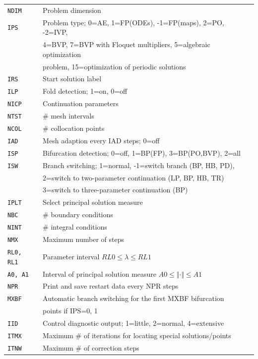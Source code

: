 \documentclass[12pt]{report}
\begin{document}
\begin{tabular}{|l|l|}
\hline
{\tt NDIM} & Problem dimension \\
{\tt IPS}  & Problem type; 0=AE, 1=FP(ODEs), -1=FP(maps), 2=PO,
           -2=IVP,\\
           & 4=BVP, 7=BVP with Floquet multipliers, 5=algebraic
           optimization \\
 	   & problem, 15=optimization of periodic solutions \\
{\tt IRS}  & Start solution label \\
{\tt ILP}  & Fold detection; 1=on, 0=off \\
\hline
{\tt NICP} & Continuation parameters \\
\hline
{\tt NTST} & \# mesh intervals \\
{\tt NCOL} & \# collocation points \\
{\tt IAD} & Mesh adaption every IAD steps; 0=off \\
{\tt ISP} & Bifurcation detection; 0=off, 1=BP(FP), 3=BP(PO,BVP), 2=all \\
{\tt ISW} & Branch switching; 1=normal, -1=switch branch (BP, HB, PD),\\
          & 2=switch to two-parameter continuation (LP, BP, HB, TR) \\
          & 3=switch to three-parameter continuation (BP) \\
{\tt IPLT} & Select principal solution measure \\
{\tt NBC} & \# boundary conditions \\
{\tt NINT} & \# integral conditions \\
\hline
{\tt NMX} & Maximum number of steps \\
{\tt RL0, RL1} & Parameter interval $ RL0 \leq \lambda \leq RL1$ \\
{\tt A0, A1} & Interval of principal solution measure $ A0 \leq
\Vert\cdot\Vert \leq A1$ \\
\hline
{\tt NPR} & Print and save restart data every NPR steps \\
{\tt MXBF} & Automatic branch switching for the first MXBF bifurcation \\
 	  & points if IPS=0, 1 	 \\
{\tt IID} & Control diagnostic output; 1=little, 2=normal, 4=extensive \\
{\tt ITMX} & Maximum \# of iterations for locating special solutions/points \\
{\tt ITNW} & Maximum \# of correction steps \\

\end{tabular}
\end{document}
